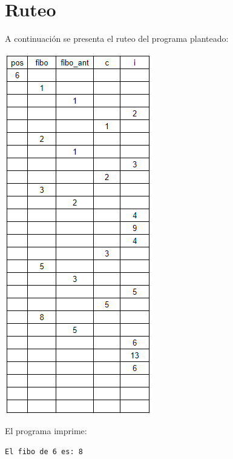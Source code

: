 \section{Ruteo}

A continuación se presenta el ruteo del programa planteado:
  
\begin{center}
    \includegraphics[scale=1]{Imagenes/p1_ruteo_pauta.png}
\end{center}

El programa imprime:

\begin{lstlisting}[style=consola]
El fibo de 6 es: 8
\end{lstlisting}

\newpage
